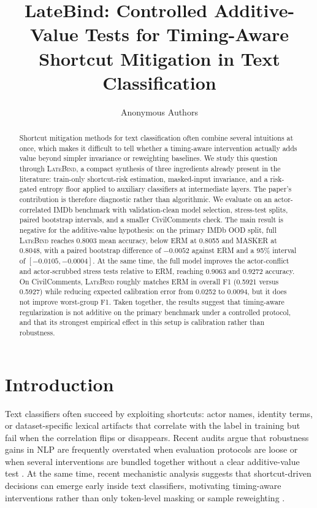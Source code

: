 \documentclass{article}
\title{LateBind: Controlled Additive-Value Tests for Timing-Aware Shortcut Mitigation in Text Classification}
\author{Anonymous Authors}
\newcommand{\LateBind}{\textsc{LateBind}}
\begin{document}
\maketitle

\begin{abstract}
Shortcut mitigation methods for text classification often combine several intuitions at once, which makes it difficult to tell whether a timing-aware intervention actually adds value beyond simpler invariance or reweighting baselines. We study this question through \LateBind, a compact synthesis of three ingredients already present in the literature: train-only shortcut-risk estimation, masked-input invariance, and a risk-gated entropy floor applied to auxiliary classifiers at intermediate layers. The paper's contribution is therefore diagnostic rather than algorithmic. We evaluate on an actor-correlated IMDb benchmark with validation-clean model selection, stress-test splits, paired bootstrap intervals, and a smaller CivilComments check. The main result is negative for the additive-value hypothesis: on the primary IMDb OOD split, full \LateBind{} reaches 0.8003 mean accuracy, below ERM at 0.8055 and MASKER at 0.8048, with a paired bootstrap difference of $-0.0052$ against ERM and a 95\% interval of $[-0.0105, -0.0004]$. At the same time, the full model improves the actor-conflict and actor-scrubbed stress tests relative to ERM, reaching 0.9063 and 0.9272 accuracy. On CivilComments, \LateBind{} roughly matches ERM in overall F1 (0.5921 versus 0.5927) while reducing expected calibration error from 0.0252 to 0.0094, but it does not improve worst-group F1. Taken together, the results suggest that timing-aware regularization is not additive on the primary benchmark under a controlled protocol, and that its strongest empirical effect in this setup is calibration rather than robustness.
\end{abstract}

\section{Introduction}

Text classifiers often succeed by exploiting shortcuts: actor names, identity terms, or dataset-specific lexical artifacts that correlate with the label in training but fail when the correlation flips or disappears. Recent audits argue that robustness gains in NLP are frequently overstated when evaluation protocols are loose or when several interventions are bundled together without a clear additive-value test \citep{gupta-etal-2024-whispers,calderon-etal-2024-measuring}. At the same time, recent mechanistic analysis suggests that shortcut-driven decisions can emerge early inside text classifiers, motivating timing-aware interventions rather than only token-level masking or sample reweighting \citep{eshuijs-etal-2025-short-circuiting}.
\end{document}
